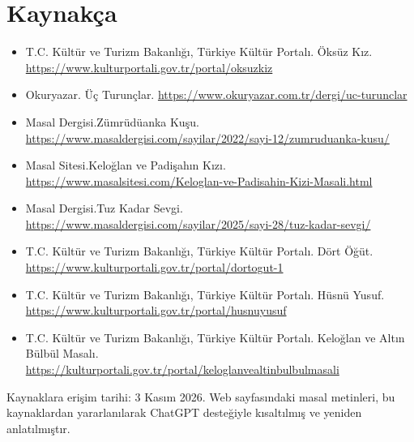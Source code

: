 \documentclass[12pt,a4paper]{article}
\begin{document}
\section{Kaynakça}
\begin{itemize}
\item T.C. Kültür ve Turizm Bakanlığı, Türkiye Kültür Portalı. Öksüz Kız. 
\url{https://www.kulturportali.gov.tr/portal/oksuzkiz}
\item Okuryazar. Üç Turunçlar. \url{https://www.okuryazar.com.tr/dergi/uc-turunclar}
\item Masal Dergisi.Zümrüdüanka Kuşu.
\url{https://www.masaldergisi.com/sayilar/2022/sayi-12/zumruduanka-kusu/}
\item Masal Sitesi.Keloğlan ve Padişahın Kızı.
\url{https://www.masalsitesi.com/Keloglan-ve-Padisahin-Kizi-Masali.html}
\item  Masal Dergisi.Tuz Kadar Sevgi.
\url{https://www.masaldergisi.com/sayilar/2025/sayi-28/tuz-kadar-sevgi/}
\item T.C. Kültür ve Turizm Bakanlığı, Türkiye Kültür Portalı. Dört Öğüt.
\url{https://www.kulturportali.gov.tr/portal/dortogut-1}
\item T.C. Kültür ve Turizm Bakanlığı, Türkiye Kültür Portalı. Hüsnü Yusuf.
\url{https://www.kulturportali.gov.tr/portal/husnuyusuf}
\item T.C. Kültür ve Turizm Bakanlığı, Türkiye Kültür Portalı. Keloğlan ve Altın Bülbül Masalı.
\url{https://kulturportali.gov.tr/portal/keloglanvealtinbulbulmasali}
\end{itemize}
Kaynaklara erişim tarihi: 3 Kasım 2026. Web sayfasındaki masal metinleri, bu kaynaklardan yararlanılarak ChatGPT desteğiyle kısaltılmış ve yeniden anlatılmıştır.



\appendix
\end{document}
